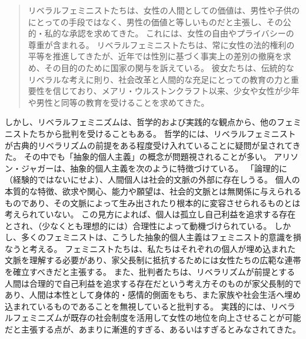 \documentclass[paper=a4,book,openany]{jlreq}
\begin{document}
\begin{quote}
リベラルフェミニストたちは、女性の人間としての価値は、男性や子供のにとっての手段ではなく、男性の価値と等しいものだと主張し、その公的・私的な承認を求めてきた。
これには、女性の自由やプライバシーの尊重が含まれる。
リベラルフェミニストたちは、常に女性の法的権利の平等を推進してきたが、近年では性別に基づく事実上の差別の撤廃を求め、その目的のために国家の関与を訴えている。
彼女たちは、伝統的なリベラルな考えに則り、社会改革と人間的な充足にとっての教育の力と重要性を信じており、メアリ・ウルストンクラフト以来、少女や女性が少年や男性と同等の教育を受けることを求めてきた。
\citep[p.66]{wendell87:_qualif_defen_liber_femin}
\end{quote}

しかし、リベラルフェミニズムは、哲学的および実践的な観点から、他のフェミニストたちから批判を受けることもある。
哲学的には、リベラルフェミニストが古典的リベラリズムの前提をある程度受け入れていることに疑問が呈されてきた。
その中でも「抽象的個人主義」の概念が問題視されることが多い。
アリソン・ジャガーは、抽象的個人主義を次のように特徴づけている。
「論理的に（経験的ではないにせよ）、人間個人は社会的文脈の外部に存在しうる。
個人の本質的な特徴、欲求や関心、能力や願望は、社会的文脈とは無関係に与えられるものであり、その文脈によって生み出されたり根本的に変容させられるものとは考えられていない\citep[pp.28-29]{jaggar83:_femin_polit_human_natur}。
この見方によれば、個人は孤立し自己利益を追求する存在とされ、（少なくとも理想的には）合理性によって動機づけられている。
しかし、多くのフェミニストは、こうした抽象的個人主義はフェミニスト的意識を損なうと考える。
フェミニストたちは、私たちはそれぞれの個人が埋め込まれた文脈を理解する必要があり、家父長制に抵抗するためには女性たちの広範な連帯を確立すべきだと主張する。
また、批判者たちは、リベラリズムが前提とする人間は合理的で自己利益を追求する存在だという考え方そのものが家父長制的であり、人間は本性として身体的・感情的側面をもち、また家族や社会生活へ埋め込まれているものであることを無視していると批判する。
実践的には、リベラルフェミニズムが既存の社会制度を活用して女性の地位を向上させることが可能だと主張する点が、あまりに漸進的すぎる、あるいはすぎるとみなされてきた。
\end{document}
